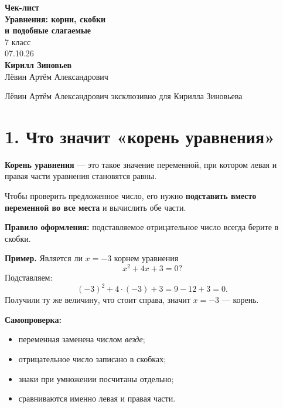 \documentclass[a4paper,12pt]{article}
\newcommand{\sectionline}{\par\vspace{0.1em}{\color{accent}\hrule height 0.6pt}\vspace{0.45em}}
\newcommand{\key}[1]{\textbf{\color{darkaccent}#1}}
\begin{document}
\thispagestyle{empty}
\begin{center}
\vspace*{25mm}

{\Large\color{darkaccent}\textbf{Чек-лист}}\\[8mm]
{\huge\bfseries Уравнения: корни, скобки\\[2mm] и подобные слагаемые}\\[10mm]

{\large 7 класс}\\[3mm]
{\large 07.10.26}\\[15mm]

{\large\textbf{Кирилл Зиновьев}}\\[4mm]
{\normalsize Лёвин Артём Александрович}

\vfill

{\normalsize\color{textgray}Лёвин Артём Александрович эксклюзивно для Кирилла Зиновьева}\\[8mm]

\end{center}
\clearpage

\section*{1. Что значит «корень уравнения»}
\sectionline

\key{Корень уравнения} — это такое значение переменной, при котором левая и правая части уравнения становятся равны.

Чтобы проверить предложенное число, его нужно \key{подставить вместо переменной во все места} и вычислить обе части.

\textbf{Правило оформления:} подставляемое отрицательное число всегда берите в скобки.

\textbf{Пример.} Является ли $x=-3$ корнем уравнения
\[
  x^2+4x+3=0?
\]
Подставляем:
\[
  (-3)^2+4\cdot(-3)+3=9-12+3=0.
\]
Получили ту же величину, что стоит справа, значит $x=-3$ — корень.

\textbf{Самопроверка:}
\begin{itemize}
  \item переменная заменена числом \emph{везде};
  \item отрицательное число записано в скобках;
  \item знаки при умножении посчитаны отдельно;
  \item сравниваются именно левая и правая части.
\end{itemize}
\end{document}
